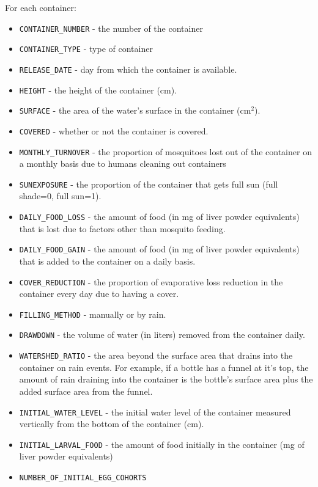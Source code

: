\documentclass[11pt]{article}
\newcommand{\linecmd}[1]{\texttt{#1}}
\begin{document}
For each container:

\begin{itemize}
	\item \linecmd{CONTAINER\_NUMBER} - the number of the container
	\item \linecmd{CONTAINER\_TYPE} - type of container %
	\item \linecmd{RELEASE\_DATE} - day from which the container is available.
	\item \linecmd{HEIGHT} - the height of the container (cm).
	\item \linecmd{SURFACE} - the area of the water's surface in the container (cm$^{2}$).
	\item \linecmd{COVERED} - whether or not the container is covered.
	\item \linecmd{MONTHLY\_TURNOVER} - the proportion of mosquitoes lost out of the container on a monthly basis due to humans cleaning out containers
	\item \linecmd{SUNEXPOSURE} - the proportion of the container that gets full sun (full shade=0, full sun=1).
	\item \linecmd{DAILY\_FOOD\_LOSS} - the amount of food (in mg of liver powder equivalents) that is lost due to factors other than mosquito feeding.
	\item \linecmd{DAILY\_FOOD\_GAIN} - the amount of food (in mg of liver powder equivalents) that is added to the container on a daily basis.
	\item \linecmd{COVER\_REDUCTION} - the proportion of evaporative loss reduction in the container every day due to having a cover.
	\item \linecmd{FILLING\_METHOD} - manually or by rain.
	\item \linecmd{DRAWDOWN} - the volume of water (in liters) removed from the container daily.
	\item \linecmd{WATERSHED\_RATIO} - the area beyond the surface area that drains into the container on rain events. For example, if a bottle has a funnel at it's top, the amount of rain draining into the container is the bottle's surface area plus the added surface area from the funnel.
	\item \linecmd{INITIAL\_WATER\_LEVEL} - the initial water level of the container measured vertically from the bottom of the container (cm).
	\item \linecmd{INITIAL\_LARVAL\_FOOD} - the amount of food initially in the container (mg of liver powder equivalents)
	\item \linecmd{NUMBER\_OF\_INITIAL\_EGG\_COHORTS}
\end{itemize}
\end{document}
